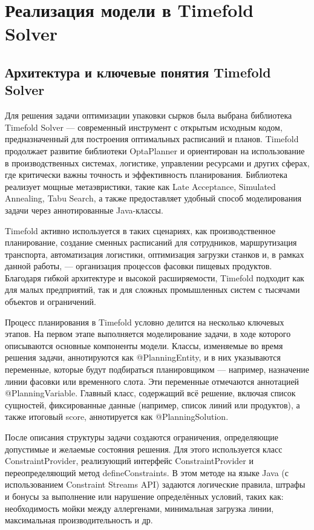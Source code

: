 \chapter{Реализация модели в Timefold Solver}
\label{ch:chapter3}

\section{Архитектура и ключевые понятия Timefold Solver}

Для решения задачи оптимизации упаковки сырков была выбрана библиотека Timefold Solver — современный инструмент с открытым исходным кодом, предназначенный для построения оптимальных расписаний и планов. Timefold продолжает развитие библиотеки OptaPlanner и ориентирован на использование в производственных системах, логистике, управлении ресурсами и других сферах, где критически важны точность и эффективность планирования. Библиотека реализует мощные метаэвристики, такие как Late Acceptance, Simulated Annealing, Tabu Search, а также предоставляет удобный способ моделирования задачи через аннотированные Java-классы.

Timefold активно используется в таких сценариях, как производственное планирование, создание сменных расписаний для сотрудников, маршрутизация транспорта, автоматизация логистики, оптимизация загрузки станков и, в рамках данной работы, — организация процессов фасовки пищевых продуктов. Благодаря гибкой архитектуре и высокой расширяемости, Timefold подходит как для малых предприятий, так и для сложных промышленных систем с тысячами объектов и ограничений.

Процесс планирования в Timefold условно делится на несколько ключевых этапов. На первом этапе выполняется моделирование задачи, в ходе которого описываются основные компоненты модели. Классы, изменяемые во время решения задачи, аннотируются как @PlanningEntity, и в них указываются переменные, которые будут подбираться планировщиком — например, назначение линии фасовки или временного слота. Эти переменные отмечаются аннотацией @PlanningVariable. Главный класс, содержащий всё решение, включая список сущностей, фиксированные данные (например, список линий или продуктов), а также итоговый score, аннотируется как @PlanningSolution.

После описания структуры задачи создаются ограничения, определяющие допустимые и желаемые состояния решения. Для этого используется класс ConstraintProvider, реализующий интерфейс ConstraintProvider и переопределяющий метод defineConstraints. В этом методе на языке Java (с использованием Constraint Streams API) задаются логические правила, штрафы и бонусы за выполнение или нарушение определённых условий, таких как: необходимость мойки между аллергенами, минимальная загрузка линии, максимальная производительность и др.

